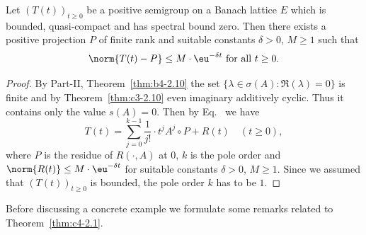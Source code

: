 \begin{theorem}\label{thm:c4-2.1}
Let $(T(t))_{t \geq 0}$ be a positive semigroup on a Banach lattice $E$ which is bounded, quasi-compact and has spectral bound zero.
Then there exists a positive projection $P$ of finite rank and suitable constants $\delta > 0$, $M \geq 1$ such that
\begin{equation}\label{eq:c4-2.1}
\norm{T(t) - P} \leq M \cdot \eu^{-\delta t} \text{ for all } t \geq 0.
\end{equation}
\end{theorem}
\begin{proof}
By Part-II, Theorem~\ref{thm:b4-2.10} the set $\{\lambda \in \sigma(A) \colon \Re(\lambda) = 0\}$ is finite and by Theorem~\ref{thm:c3-2.10}  even imaginary additively cyclic.
Thus it contains only the value $s(A) = 0$.
Then by %
Eq.~ 
we have
\begin{equation*}\label{eq:c4-2.1-kgk}
T(t) = \sum_{j=0}^{k-1} \frac{1}{j!} \cdot t^{j}A^{j}\circ P + R(t) \quad (t \geq 0),
\end{equation*}
where $P$ is the residue of\/ $R(\cdot,A)$ at $0$, $k$ is the pole order and $\norm{R(t)} \leq M \cdot \eu^{-\delta t}$ for suitable constants $\delta > 0$, $M \geq 1$.
Since we assumed that $(T(t))_{t \geq 0}$ is bounded, the pole order $k$ has to be $1$.
\end{proof}
Before discussing a concrete example we formulate some remarks related to Theorem~\ref{thm:c4-2.1}.
